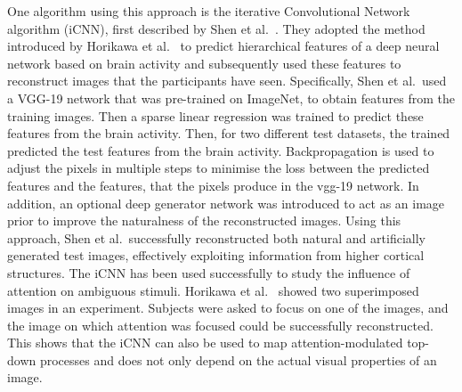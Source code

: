 One algorithm using this approach is the iterative Convolutional Network algorithm (iCNN), first described by Shen et al.~\cite{shenDeepImageReconstruction2019}. They adopted the method introduced by Horikawa et al.~\cite{horikawaGenericDecodingSeen2017} to predict hierarchical features of a deep neural network based on brain activity and subsequently used these features to reconstruct images that the participants have seen. Specifically, Shen et al.\ used a VGG-19 network that was pre-trained on ImageNet, to obtain features from the training images. Then a sparse linear regression was trained to predict these features from the brain activity. Then, for two different test datasets, the trained  predicted the test features from the brain activity. Backpropagation is used to adjust the pixels in multiple steps to minimise the loss between the predicted features and the features, that the pixels produce in the vgg-19 network. In addition, an optional deep generator network was introduced to act as an image prior to improve the naturalness of the reconstructed images. Using this approach, Shen et al.\ successfully reconstructed both natural and artificially generated test images, effectively exploiting information from higher cortical structures. The iCNN has been used successfully to study the influence of attention on ambiguous stimuli. Horikawa et al.~\cite{horikawaAttentionModulatesNeural2022} showed two superimposed images in an experiment. Subjects were asked to focus on one of the images, and the image on which attention was focused could be successfully reconstructed. This shows that the iCNN can also be used to map attention-modulated top-down processes and does not only depend on the actual visual properties of an image.

